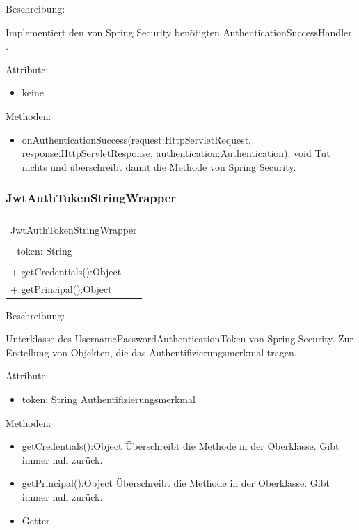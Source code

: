 \documentclass[a4paper,20pt,oneside]{book}
\begin{document}
	\vspace{0.5cm}
	\raggedright
	Beschreibung:
	
	Implementiert den von Spring Security benötigten AuthenticationSuccessHandler	.
	
	\vspace{0.5cm}
	Attribute:
	\begin{itemize}
	\item keine
	\end{itemize}
	
	Methoden:
	\begin{itemize}
	\item onAuthenticationSuccess(request:HttpServletRequest, response:HttpServletResponse, authentication:Authentication): void\linebreak
	Tut nichts und überschreibt damit die Methode von Spring Security.
	\end{itemize}
	
	\subsubsection{JwtAuthTokenStringWrapper}
\centering
	\begin{tabular}{|l|}
	\hline \\
	JwtAuthTokenStringWrapper\\ \hline \\
	- token: String\\
	 \hline \\
	+ getCredentials():Object\\
	+ getPrincipal():Object\\
	 \hline
	\end{tabular}
		 
	\vspace{0.5cm}
	\raggedright
	Beschreibung:
	
	Unterklasse des  UsernamePasswordAuthenticationToken von Spring Security. Zur Erstellung von Objekten, die das Authentifizierungsmerkmal tragen.
	
	\vspace{0.5cm}
	Attribute:
	\begin{itemize}
	\item token: String\linebreak
	Authentifizierungsmerkmal
	\end{itemize}
	
	Methoden:
	\begin{itemize}
	\item getCredentials():Object\linebreak
	Überschreibt die Methode in der Oberklasse. Gibt immer null zurück.
	\item getPrincipal():Object\linebreak
	Überschreibt die Methode in der Oberklasse. Gibt immer null zurück.
	\item Getter
	\end{itemize}
	
\end{document}
